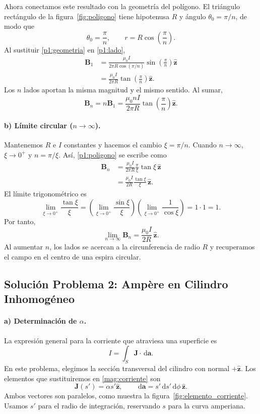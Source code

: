 \documentclass[11pt]{article}
\newcommand{\dd}{\,\mathrm{d}}
\newcommand{\ez}{\hat{\mathbf{z}}}
\begin{document}
Ahora conectamos este resultado con la geometría del polígono.
El triángulo rectángulo de la figura~\ref{fig:poligono} tiene
hipotenusa $R$ y ángulo $\theta_0=\pi/n$, de modo que
\begin{equation}
  \theta_0=\frac{\pi}{n},
  \qquad
  r=R\cos\left(\frac{\pi}{n}\right).
  \label{p1:geometria}
\end{equation}
Al sustituir \eqref{p1:geometria} en \eqref{p1:lado},
\begin{align*}
  \mathbf B_1
    &=\frac{\mu_0 I}{2\pi R\cos(\pi/n)}
      \sin\left(\frac{\pi}{n}\right)\ez\\
    &=\frac{\mu_0 I}{2\pi R}
      \tan\left(\frac{\pi}{n}\right)\ez.
\end{align*}
Los $n$ lados aportan la misma magnitud y el mismo sentido.
Al sumar,
\begin{equation}
  \boxed{
    \mathbf B_n=n\mathbf B_1
      =\frac{\mu_0 nI}{2\pi R}
       \tan\left(\frac{\pi}{n}\right)\ez.
  }
  \label{p1:poligono}
\end{equation}

\paragraph{b) Límite circular ($n\to\infty$).}
Mantenemos $R$ e $I$ constantes y hacemos el cambio
$\xi=\pi/n$. Cuando $n\to\infty$, $\xi\to0^+$ y $n=\pi/\xi$.
Así, \eqref{p1:poligono} se escribe como
\begin{align*}
  \mathbf B_n
    &=\frac{\mu_0 I}{2\pi R}
      \frac{\pi}{\xi}\tan\xi\,\ez\\
    &=\frac{\mu_0 I}{2R}
      \frac{\tan\xi}{\xi}\,\ez.
\end{align*}
El límite trigonométrico es
\[
  \lim_{\xi\to0^+}\frac{\tan\xi}{\xi}
    =\left(\lim_{\xi\to0^+}\frac{\sin\xi}{\xi}\right)
      \left(\lim_{\xi\to0^+}\frac{1}{\cos\xi}\right)
    =1\cdot1=1.
\]
Por tanto,
\[
  \boxed{
    \lim_{n\to\infty}\mathbf B_n
      =\frac{\mu_0 I}{2R}\,\ez.
  }
\]
Al aumentar $n$, los lados se acercan a la circunferencia de radio
$R$ y recuperamos el campo en el centro de una espira circular.

\clearpage
\subsection*{Solución Problema 2: Ampère en Cilindro Inhomogéneo}

\paragraph{a) Determinación de $\alpha$.}
La expresión general para la corriente que atraviesa una superficie es
\begin{equation}
  I=\int_S\mathbf J\cdot\dd\mathbf a.
  \label{mag:corriente}
\end{equation}
En este problema, elegimos la sección transversal del cilindro con
normal $+\ez$. Los elementos que sustituiremos en
\eqref{mag:corriente} son
\[
  \mathbf J(s')=\alpha s'\ez,
  \qquad
  \dd\mathbf a=s'\dd s'\dd\phi\,\ez.
\]
Ambos vectores son paralelos, como muestra la
figura~\ref{fig:elemento_corriente}. Usamos $s'$ para el radio de
integración, reservando $s$ para la curva amperiana.
\end{document}
